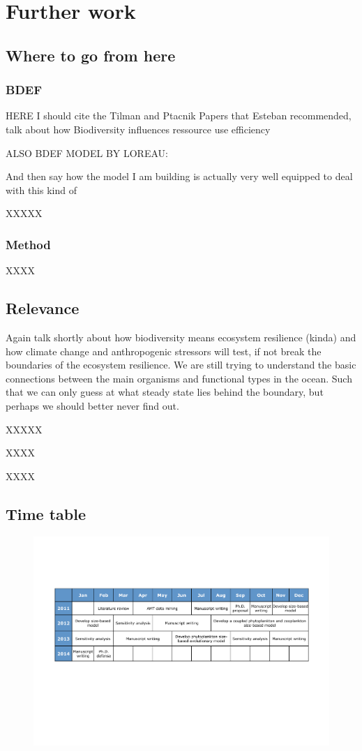 \chapter {Further work}

\section{Where to go from here}

\subsection{BDEF}

 HERE I should cite the Tilman and Ptacnik Papers that Esteban recommended, talk about how Biodiversity influences ressource use efficiency
 
ALSO BDEF MODEL BY LOREAU: \citep{Loreau1998b}
 
 And then say how the model I am building is actually very well equipped to deal with this kind of 


XXXXX

\subsection{Method}
XXXX




\section{Relevance}
Again talk shortly about how biodiversity means ecosystem resilience (kinda) and how climate change and anthropogenic stressors will test, if not break the boundaries of the ecosystem resilience. We are still trying to understand the basic connections between the main organisms and functional types in the ocean. Such that we can only guess at what steady state lies behind the boundary, but perhaps we should better never find out.

XXXXX


XXXX

XXXX


\newpage

\section{Time table} 

\begin{figure}[h]
\centering
\includegraphics[trim = 20mm 25mm 20mm 25mm, clip, width=1\linewidth]{./Chp3-Further/Chronogram.pdf}
\end{figure}

